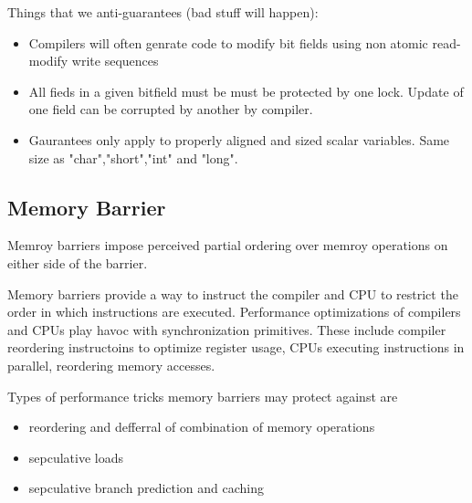 \documentclass{article}
\begin{document}
Things that we anti-guarantees (bad stuff will happen):

\begin{itemize}


\item Compilers will often genrate code to modify bit fields using non
  atomic read-modify write sequences


\item All fieds in a given bitfield must be must be protected by one
  lock. Update of one field can be corrupted by another by compiler.
  
\item Gaurantees only apply to properly aligned and sized scalar
  variables. Same size as "char","short","int" and "long".  


\end{itemize}

\subsection{Memory Barrier}

Memroy barriers impose perceived partial ordering over memroy
operations on either side of the barrier.

Memory barriers provide a way to instruct the compiler and CPU to
restrict the order in which instructions are executed. Performance
optimizations of compilers and CPUs play havoc with synchronization
primitives. These include compiler reordering instructoins to optimize
register usage, CPUs executing instructions in parallel, reordering
memory accesses.


Types of performance tricks memory barriers may protect against are
\begin{itemize}
\item reordering and defferral of combination of memory operations
\item sepculative loads
\item sepculative branch prediction and caching
\end{itemize}
\end{document}
